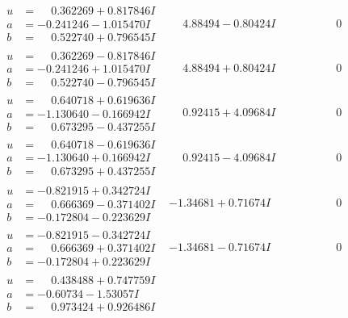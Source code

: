 \documentclass[1p]{elsarticle_modified}
\theoremstyle{definition}
\begin{document}
$$\begin{array}{c|c|c}
\begin{aligned}
u &= \phantom{-}0.362269 + 0.817846 I \\
a &= -0.241246 - 1.015470 I \\
b &= \phantom{-}0.522740 + 0.796545 I\end{aligned}
 & \phantom{-}4.88494 - 0.80424 I & \phantom{-0.000000 } 0 \\ \hline\begin{aligned}
u &= \phantom{-}0.362269 - 0.817846 I \\
a &= -0.241246 + 1.015470 I \\
b &= \phantom{-}0.522740 - 0.796545 I\end{aligned}
 & \phantom{-}4.88494 + 0.80424 I & \phantom{-0.000000 } 0 \\ \hline\begin{aligned}
u &= \phantom{-}0.640718 + 0.619636 I \\
a &= -1.130640 - 0.166942 I \\
b &= \phantom{-}0.673295 - 0.437255 I\end{aligned}
 & \phantom{-}0.92415 + 4.09684 I & \phantom{-0.000000 } 0 \\ \hline\begin{aligned}
u &= \phantom{-}0.640718 - 0.619636 I \\
a &= -1.130640 + 0.166942 I \\
b &= \phantom{-}0.673295 + 0.437255 I\end{aligned}
 & \phantom{-}0.92415 - 4.09684 I & \phantom{-0.000000 } 0 \\ \hline\begin{aligned}
u &= -0.821915 + 0.342724 I \\
a &= \phantom{-}0.666369 - 0.371402 I \\
b &= -0.172804 - 0.223629 I\end{aligned}
 & -1.34681 + 0.71674 I & \phantom{-0.000000 } 0 \\ \hline\begin{aligned}
u &= -0.821915 - 0.342724 I \\
a &= \phantom{-}0.666369 + 0.371402 I \\
b &= -0.172804 + 0.223629 I\end{aligned}
 & -1.34681 - 0.71674 I & \phantom{-0.000000 } 0 \\ \hline\begin{aligned}
u &= \phantom{-}0.438488 + 0.747759 I \\
a &= -0.60734 - 1.53057 I \\
b &= \phantom{-}0.973424 + 0.926486 I\end{aligned}

\end{array}$$
\end{document}
